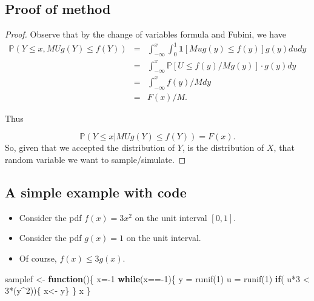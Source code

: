 \documentclass[
]{article}
\newenvironment{Shaded}{\begin{snugshade}}{\end{snugshade}}
\newcommand{\ControlFlowTok}[1]{\textcolor[rgb]{0.13,0.29,0.53}{\textbf{#1}}}
\newcommand{\DecValTok}[1]{\textcolor[rgb]{0.00,0.00,0.81}{#1}}
\newcommand{\FunctionTok}[1]{\textcolor[rgb]{0.00,0.00,0.00}{#1}}
\newcommand{\NormalTok}[1]{#1}
\newcommand{\OtherTok}[1]{\textcolor[rgb]{0.56,0.35,0.01}{#1}}
\newcommand{\SpecialCharTok}[1]{\textcolor[rgb]{0.00,0.00,0.00}{#1}}
\providecommand{\tightlist}{%
  \setlength{\itemsep}{0pt}\setlength{\parskip}{0pt}}
\theoremstyle{definition}
\theoremstyle{definition}
\theoremstyle{definition}
\theoremstyle{remark}
\begin{document}
\hypertarget{proof-of-method}{%
\subsection{Proof of method}\label{proof-of-method}}

\begin{proof}
{}Observe that by the change of variables formula and Fubini, we have
\begin{eqnarray*}
 \mathbb{P}(Y \leq x, MU g(Y) \leq f(Y)) 
&=& \int_{-\infty} ^x \int_0 ^1 \mathbf{1}[Mu g(y) \leq f(y)]g(y)dudy \\
&=&  \int_{-\infty} ^x  \mathbb{P}[U \leq f(y)/Mg(y)] \cdot g(y) dy \\
&=&  \int_{-\infty} ^x f(y)/M dy \\
&=&  F(x)/M.
\end{eqnarray*}

Thus

\[
\mathbb{P}(Y \leq x | MU g(Y) \leq f(Y)) = F(x).
\]
So, given that we accepted the distribution of \(Y\), is the distribution of \(X\), that random variable we want to sample/simulate.
\end{proof}

\hypertarget{a-simple-example-with-code}{%
\subsection{A simple example with code}\label{a-simple-example-with-code}}

\begin{itemize}
\tightlist
\item
  Consider the pdf \(f(x) = 3x^2\) on the unit interval \([0,1]\).
\item
  Consider the pdf \(g(x) = 1\) on the unit interval.
\item
  Of course, \(f(x) \leq 3 g(x)\).
\end{itemize}

\begin{Shaded}
\begin{Highlighting}[]
\NormalTok{samplef }\OtherTok{\textless{}{-}} \ControlFlowTok{function}\NormalTok{()\{}
\NormalTok{x}\OtherTok{=}\SpecialCharTok{{-}}\DecValTok{1}
\ControlFlowTok{while}\NormalTok{(x}\SpecialCharTok{=={-}}\DecValTok{1}\NormalTok{)\{}
\NormalTok{y }\OtherTok{=} \FunctionTok{runif}\NormalTok{(}\DecValTok{1}\NormalTok{)}
\NormalTok{u }\OtherTok{=} \FunctionTok{runif}\NormalTok{(}\DecValTok{1}\NormalTok{)}
\ControlFlowTok{if}\NormalTok{( u}\SpecialCharTok{*}\DecValTok{3} \SpecialCharTok{\textless{}} \DecValTok{3}\SpecialCharTok{*}\NormalTok{(y}\SpecialCharTok{\^{}}\DecValTok{2}\NormalTok{))\{ x}\OtherTok{\textless{}{-}}\NormalTok{ y\}}
\NormalTok{\}}
\NormalTok{x}
\NormalTok{\}}
\end{Highlighting}
\end{Shaded}
\end{document}
